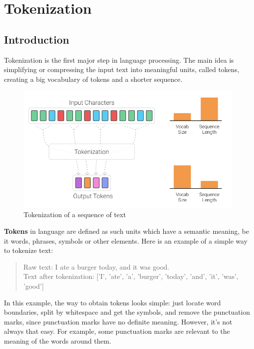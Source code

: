 %
%

\chapter{Tokenization}\label{sec:tokenization}

\section{Introduction}

Tokenization is the first major step in language processing. The main idea is simplifying or compressing the input text into meaningful units, called tokens, creating a big vocabulary of tokens and a shorter sequence.~\cite{manning2008introduction}

\begin{figure}[!ht]
    \centering
    \includegraphics[width=12cm]{figures/tokenization.png}
    \caption{Tokenization of a sequence of text}
\end{figure}

\textbf{Tokens} in language are defined as such units which have a semantic meaning, be it words, phrases, symbols or other elements. Here is an example of a simple way to tokenize text:

\begin{quote}
    Raw text: I ate a burger today, and it was good.\\
    Text after tokenization: ['I', 'ate', 'a', 'burger', 'today', 'and', 'it', 'was', 'good']
\end{quote}

In this example, the way to obtain tokens looks simple: just locate word boundaries, split by whitespace and get the symbols, and remove the punctuation marks, since punctuation marks have no definite meaning. However, it's not always that easy. For example, some punctuation marks are relevant to the meaning of the words around them.

